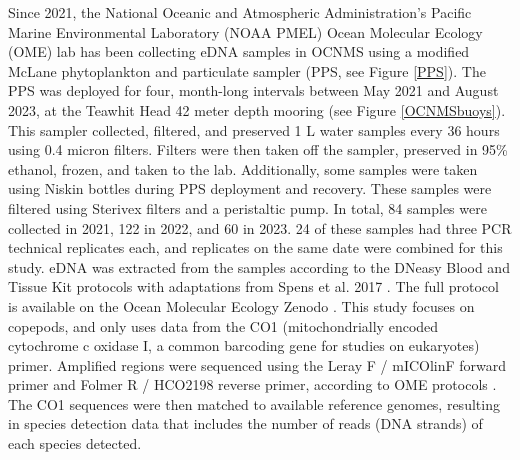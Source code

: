 \documentclass[12pt,twoside]{reedthesis}
\begin{document}
Since 2021, the National Oceanic and Atmospheric Administration's Pacific Marine Environmental Laboratory (NOAA PMEL) Ocean Molecular Ecology (OME) lab has been collecting eDNA samples in OCNMS using a modified McLane phytoplankton and particulate sampler (PPS, see Figure \ref{PPS}).  The PPS was deployed for four, month-long intervals between May 2021 and August 2023, at the Teawhit Head 42 meter depth mooring (see Figure \ref{OCNMSbuoys}). This sampler collected, filtered, and preserved 1 L water samples every 36 hours using 0.4 micron filters. Filters were then taken off the sampler, preserved in 95\% ethanol, frozen, and taken to the lab. Additionally, some samples were taken using Niskin bottles during PPS deployment and recovery. These samples were filtered using Sterivex filters and a peristaltic pump. In total, 84 samples were collected in 2021, 122 in 2022, and 60 in 2023. 24 of these samples had three PCR technical replicates each, and replicates on the same date were combined for this study. eDNA was extracted from the samples according to the DNeasy Blood and Tissue Kit protocols with adaptations from Spens et al. 2017 \autocite{Spens2017}. The full protocol is available on the Ocean Molecular Ecology Zenodo \autocite{Weinrich2025}. This study focuses on copepods, and only uses data from the CO1 (mitochondrially encoded cytochrome c oxidase I, a common barcoding gene for studies on eukaryotes) primer. Amplified regions were sequenced using the  Leray F / mICOlinF forward primer and Folmer R / HCO2198 reverse primer, according to OME protocols \autocite{Gold2024, Spens2017}. The CO1 sequences were then matched to available reference genomes, resulting in species detection data that includes the number of reads (DNA strands) of each species detected.
\end{document}

